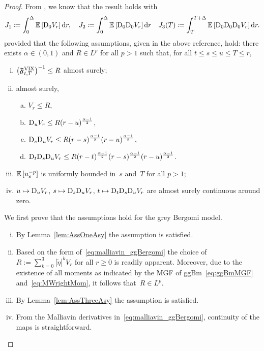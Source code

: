 \begin{proof}
From \cite[Proposition~4.1]{Jacquier2021RoughOptions},
we know that the result holds with
$$
J_1\coloneqq\int_0^{\Delta} \mathbb{E}\left[\mathrm{D}_0 V_r\right] \mathrm{d} r, \quad J_2\coloneqq\int_0^{\Delta} \mathbb{E}\left[\mathrm{D}_0 \mathrm{D}_0 V_r\right] \mathrm{d} r \quad J_3(T)\coloneqq\int_T^{T+\Delta} \mathbb{E}\left[\mathrm{D}_0 \mathrm{D}_0 \mathrm{D}_0 V_r\right] \mathrm{d} r.
$$
provided that the following assumptions, given in the above reference, hold:
there exists $\alpha \in \left(0, 1\right)$ and $R \in L^p$ for all $p>1$ such that,
for all $t \leq s \leq u \leq T \leq r$,
     \begin{enumerate}[(i)]
         \item $\left(\mathfrak{F}^{\mathrm{VIX}}_{t,T}\right)^{-1} \leq R$ almost surely;
         \item almost surely,
         \begin{enumerate}[a)]
             \item $V_r \leq R$, 
             \item $\mathrm{D}_u V_r \leq R (r-u)^{\frac{\alpha-1}{2}}$,
             \item $\mathrm{D}_s \mathrm{D}_u V_r \leq R(r-s)^{\frac{\alpha-1}{2}}(r-u)^{\frac{\alpha-1}{2}}$,
             \item $\mathrm{D}_t \mathrm{D}_s \mathrm{D}_u V_r \leq R(r-t)^{\frac{\alpha-1}{2}}(r-s)^{\frac{\alpha-1}{2}}(r-u)^{\frac{\alpha-1}{2}}$.
         \end{enumerate}
         \item $\mathbb{E}\left[u_s^{-p}\right]$ is uniformly bounded in~$s$ and~$T$ for all $p>1$;
         \item $u \mapsto \mathrm{D}_u V_r$, $s \mapsto \mathrm{D}_s \mathrm{D}_u V_r$, $t \mapsto \mathrm{D}_t \mathrm{D}_s \mathrm{D}_u V_r$ are almost surely continuous around zero.
     \end{enumerate}
We first prove that the assumptions hold for the grey Bergomi model.
    \begin{enumerate}[(i)]
        \item By Lemma~\ref{lem:AssOneAsy} the assumption is satisfied.
        \item Based on the form of~\eqref{eq:malliavin_ggBergomi} the choice of~$R:=\sum_{k=0}^3|\tilde\eta|^k V_r$ for all $r\geq 0$ is readily apparent. Moreover, due to the existence of all moments as indicated by the MGF of ggBm~\ref{eq:ggBmMGF} and~\eqref{eq:MWrightMom}, it follows that~$R\in L^p$.
        \item By Lemma~\ref{lem:AssThreeAsy} the assumption is satisfied.
        \item From the Malliavin derivatives in~\eqref{eq:malliavin_ggBergomi}, continuity of the maps is straightforward.
    \end{enumerate}


\end{proof}
